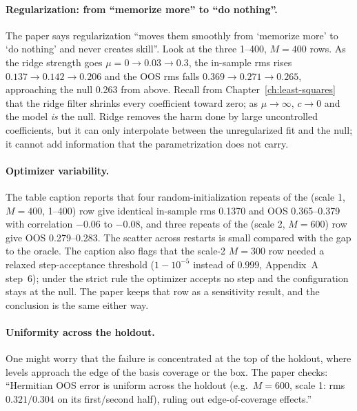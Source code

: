 \paragraph{Regularization: from ``memorize more'' to ``do nothing''.} The paper says regularization ``moves them smoothly from `memorize more' to `do nothing' and never creates skill''. Look at the three 1--400, $M=400$ rows. As the ridge strength goes $\mu=0\to0.03\to0.3$, the in-sample rms rises $0.137\to0.142\to0.206$ and the OOS rms falls $0.369\to0.271\to0.265$, approaching the null 0.263 from above. Recall from Chapter~\ref{ch:least-squares} that the ridge filter shrinks every coefficient toward zero; as $\mu\to\infty$, $c\to0$ and the model \emph{is} the null. Ridge removes the harm done by large uncontrolled coefficients, but it can only interpolate between the unregularized fit and the null; it cannot add information that the parametrization does not carry.

\paragraph{Optimizer variability.} The table caption reports that four random-initialization repeats of the (scale 1, $M=400$, 1--400) row give identical in-sample rms 0.1370 and OOS 0.365--0.379 with correlation $-0.06$ to $-0.08$, and three repeats of the (scale 2, $M=600$) row give OOS 0.279--0.283. The scatter across restarts is small compared with the gap to the oracle. The caption also flags that the scale-2 $M=300$ row needed a relaxed step-acceptance threshold ($1-10^{-5}$ instead of $0.999$, Appendix~A step~6); under the strict rule the optimizer accepts no step and the configuration stays at the null. The paper keeps that row as a sensitivity result, and the conclusion is the same either way.

\paragraph{Uniformity across the holdout.} One might worry that the failure is concentrated at the top of the holdout, where levels approach the edge of the basis coverage or the box. The paper checks: ``Hermitian OOS error is uniform across the holdout (e.g.\ $M=600$, scale 1: rms $0.321/0.304$ on its first/second half), ruling out edge-of-coverage effects.''

